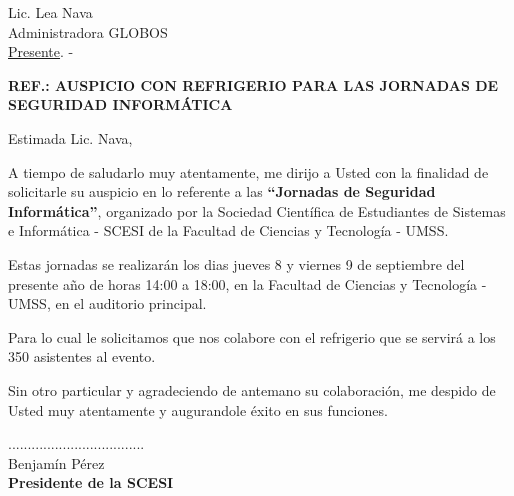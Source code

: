 \documentclass[letterpaper,12pt]{letter}
\begin{document}
\date {18 de agosto de 2011}

\begin{letter}{Lic. Lea Nava \\ Administradora GLOBOS \\\underline {Presente}. -}

\begin{center}
	\opening{\textbf{REF.: AUSPICIO CON REFRIGERIO PARA LAS JORNADAS DE SEGURIDAD INFORM\'ATICA}}
\end{center}

Estimada Lic. Nava,

A tiempo de saludarlo muy atentamente, me dirijo a Usted con la finalidad de solicitarle su auspicio en lo referente 
a las {\bfseries ``Jornadas de Seguridad Inform\'atica''}, organizado por la Sociedad Cient\'ifica de Estudiantes de 
Sistemas e Inform\'atica - SCESI de la Facultad de Ciencias y Tecnolog\'ia - UMSS.

Estas jornadas se realizar\'an los dias jueves 8 y viernes 9 de septiembre del presente a\~no de horas 14:00 a 
18:00, en la Facultad de Ciencias y Tecnolog\'ia - UMSS, en el auditorio principal.

Para lo cual le solicitamos que nos colabore con el refrigerio que se servir\'a a los 350 asistentes al evento.

Sin otro particular y agradeciendo de antemano su colaboraci\'on, me despido de Usted muy atentamente y augurandole \'exito en sus funciones.\\

\vspace{2cm}

\begin{center}
...................................\\
Benjam\'in P\'erez\\
{\bfseries Presidente de la  SCESI}
\end{center}

\end{letter}
\end{document}
